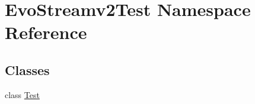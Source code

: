 \hypertarget{namespaceEvoStreamv2Test}{}\section{Evo\+Streamv2\+Test Namespace Reference}
\label{namespaceEvoStreamv2Test}
\subsection*{Classes}
\begin{DoxyCompactItemize}
\item 
class \hyperlink{classEvoStreamv2Test_1_1Test}{Test}
\end{DoxyCompactItemize}
